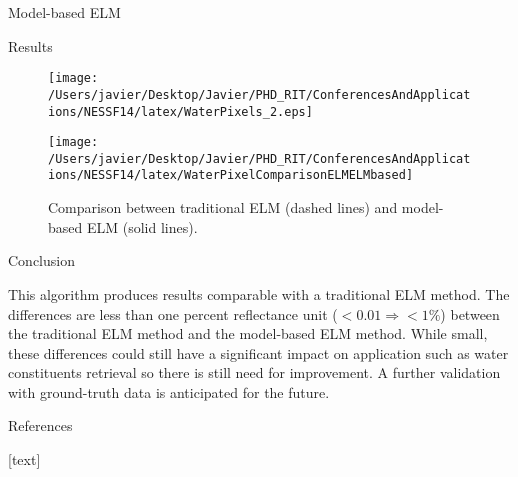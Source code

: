 \documentclass{beamer}
\begin{document}
\begin{frame}{}
\begin{columns}[t]
\begin{column}{.3\linewidth}
\begin{block}{Model-based ELM}
\end{block}
\begin{block}{Results}
\begin{figure}[htb]
  \begin{minipage}[c]{0.48\linewidth}
    \centering
      \texttt{[image: /Users/javier/Desktop/Javier/PHD\_RIT/ConferencesAndApplications/NESSF14/latex/WaterPixels\_2.eps]}
      \caption{Water pixel spectra after applying the model-based ELM atmospheric correction method.}
      \label{fig:waterpxs}
  \end{minipage}
  \hfill
  \begin{minipage}[d]{0.48\linewidth}
    \centering
      \texttt{[image: /Users/javier/Desktop/Javier/PHD\_RIT/ConferencesAndApplications/NESSF14/latex/WaterPixelComparisonELMELMbased]}
      \caption{Comparison between traditional ELM (dashed lines) and model-based ELM (solid lines).}
      \label{fig:refcomp}
  \end{minipage}
\end{figure} 
\end{block}  


\begin{block}{Conclusion}
	
\justifying\small This algorithm produces results comparable with a traditional ELM method. The differences are less than one percent reflectance unit ($<0.01\Rightarrow <1\%$) between the traditional ELM method and the model-based ELM method. While small, these differences could still have a significant impact on application such as water constituents retrieval so there is still need for improvement. A further validation with ground-truth data is anticipated for the future.
\vspace{.3cm}
\end{block}


\begin{block}{References} 
   
 { \scriptsize 
{}[text]
				
				
}
\end{block} 

\end{column}
\end{columns}
\end{frame}
\end{document}
